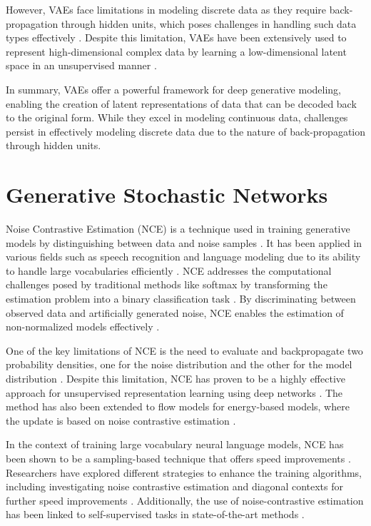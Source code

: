 However, VAEs face limitations in modeling discrete data as they require back-propagation through hidden units, which poses challenges in handling such data types effectively \citep{10.48550/arxiv.1909.13062}. Despite this limitation, VAEs have been extensively used to represent high-dimensional complex data by learning a low-dimensional latent space in an unsupervised manner \citep{10.48550/arxiv.2106.06500}.

In summary, VAEs offer a powerful framework for deep generative modeling, enabling the creation of latent representations of data that can be decoded back to the original form. While they excel in modeling continuous data, challenges persist in effectively modeling discrete data due to the nature of back-propagation through hidden units.


\section*{Generative Stochastic Networks}


Noise Contrastive Estimation (NCE) is a technique used in training generative models by distinguishing between data and noise samples \citep{10.21437/interspeech.2016-1295}. It has been applied in various fields such as speech recognition and language modeling due to its ability to handle large vocabularies efficiently \citep{10.1609/aaai.v32i1.11967}. NCE addresses the computational challenges posed by traditional methods like softmax by transforming the estimation problem into a binary classification task \citep{10.18653/v1/e17-2003}. By discriminating between observed data and artificially generated noise, NCE enables the estimation of non-normalized models effectively \citep{10.48550/arxiv.1805.07516}.

One of the key limitations of NCE is the need to evaluate and backpropagate two probability densities, one for the noise distribution and the other for the model distribution \citep{10.18653/v1/e17-2003}. Despite this limitation, NCE has proven to be a highly effective approach for unsupervised representation learning using deep networks \citep{10.48550/arxiv.2205.01789}. The method has also been extended to flow models for energy-based models, where the update is based on noise contrastive estimation \citep{10.1109/cvpr42600.2020.00754}.

In the context of training large vocabulary neural language models, NCE has been shown to be a sampling-based technique that offers speed improvements \citep{10.18653/v1/p16-1186}. Researchers have explored different strategies to enhance the training algorithms, including investigating noise contrastive estimation and diagonal contexts for further speed improvements \citep{10.3115/v1/n15-1083}. Additionally, the use of noise-contrastive estimation has been linked to self-supervised tasks in state-of-the-art methods \citep{10.48550/arxiv.2203.01110}.

